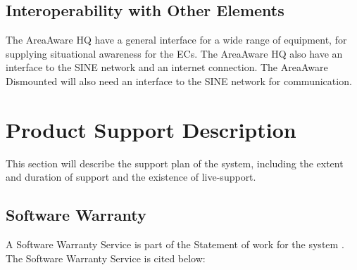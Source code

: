 \subsection{Interoperability with Other Elements}
The AreaAware HQ have a general interface for a wide range of equipment, for supplying situational awareness for the ECs. The AreaAware HQ also have an interface to the SINE network and an internet connection. The AreaAware Dismounted will also need an interface to the SINE network for communication.

\newpage
\section{Product Support Description}
This section will describe the support plan of the system, including the extent and duration of support and the existence of live-support. 

\subsection{Software Warranty}
A Software Warranty Service is part of the Statement of work for the system \cite{Casebook}. The Software Warranty Service is cited below: \\

